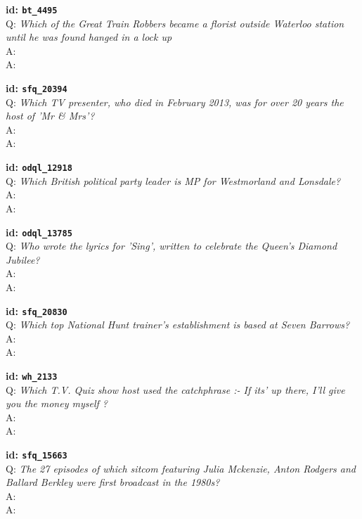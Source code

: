 \tiny{\setlength{\parindent}{0cm}
\textbf{id: \texttt{bt\_4495}} \\
Q: \textit{Which of the Great Train Robbers became a florist outside Waterloo station until he was found hanged in a lock up} \\
A:  \\
A: }

\tiny{\setlength{\parindent}{0cm}
\textbf{id: \texttt{sfq\_20394}} \\
Q: \textit{Which TV presenter, who died in February 2013, was for over 20 years the host of 'Mr \& Mrs'?} \\
A:  \\
A: }

\tiny{\setlength{\parindent}{0cm}
\textbf{id: \texttt{odql\_12918}} \\
Q: \textit{Which British political party leader is MP for Westmorland and Lonsdale?} \\
A:  \\
A: }

\tiny{\setlength{\parindent}{0cm}
\textbf{id: \texttt{odql\_13785}} \\
Q: \textit{Who wrote the lyrics for 'Sing', written to celebrate the Queen's Diamond Jubilee?} \\
A:  \\
A: }

\tiny{\setlength{\parindent}{0cm}
\textbf{id: \texttt{sfq\_20830}} \\
Q: \textit{Which top National Hunt trainer's establishment is based at Seven Barrows?} \\
A:  \\
A: }

\tiny{\setlength{\parindent}{0cm}
\textbf{id: \texttt{wh\_2133}} \\
Q: \textit{Which T.V. Quiz show host used the catchphrase :- If its' up there, I'll give you the money myself ?} \\
A:  \\
A: }

\tiny{\setlength{\parindent}{0cm}
\textbf{id: \texttt{sfq\_15663}} \\
Q: \textit{The 27 episodes of which sitcom featuring Julia Mckenzie, Anton Rodgers and Ballard Berkley were first broadcast in the 1980s?} \\
A:  \\
A: }

